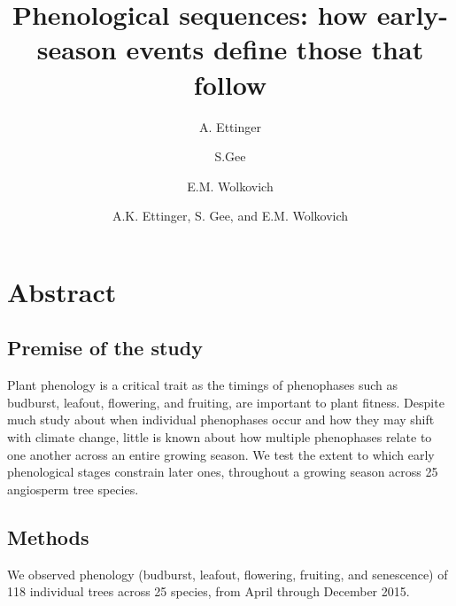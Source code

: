 \documentclass{article}
\begin{document}

\title{Phenological sequences: how early-season events define those that follow} %
\author[1,2,a]{A. Ettinger}
\author[1]{S.Gee}
\author[1,3]{E.M. Wolkovich}
\author{A.K. Ettinger, S. Gee, and E.M. Wolkovich}

\maketitle %


\section*{Abstract}
\subsection*{Premise of the study}
Plant phenology is a critical trait as the timings of phenophases such as budburst, leafout, flowering, and fruiting, are important to plant fitness. Despite much study about when individual phenophases occur and how they may shift with climate change, little is known about how multiple phenophases relate to one another across an entire growing season. We test the extent to which early phenological stages constrain later ones, throughout a growing season across 25 angiosperm tree species. 
\subsection*{Methods}
We observed phenology (budburst, leafout, flowering, fruiting, and senescence) of 118 individual trees across 25 species, from April through December 2015. 
\end{document}
